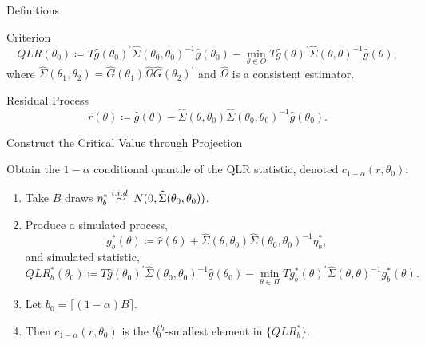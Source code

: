 \documentclass[smaller, aspectratio=169]{beamer}
\begin{document}
\begin{frame}[c]{Definitions}

    \begin{block}{Criterion}
        \begin{equation*}
          QLR(\theta_{0}) \coloneqq T \widehat{g} (\theta_{0})^{\prime}\widehat{\Sigma} (\theta_{0}, \theta_{0})^{-1}\widehat{g}(\theta_{0})-\underset{\theta \in \Theta}{\min}T\widehat{g}(\theta)^{\prime}\widehat{\Sigma} (\theta, \theta)^{-1}\widehat{g}(\theta),  
        \end{equation*}
        \quad where $\widehat{\Sigma}\left(\theta_{1}, \theta_{2}\right) = \widehat{G}(\theta_{1})\widehat{\Omega}\widehat{G}(\theta_{2})^{\prime}$ and $\widehat{\Omega}$ is a consistent estimator.
    \end{block}
 
    \vfill
%    
    \begin{block}{Residual Process}
        \begin{equation*}
          \widehat{r}(\theta) \coloneqq \widehat{g}(\theta)-\widehat{\Sigma}(\theta, \theta_{0})\widehat{\Sigma}(\theta_{0}, \theta_{0})^{-1}\widehat{g} (\theta_{0}). 
        \end{equation*}
    \end{block}

\end{frame}

\begin{frame}[c]{Construct the Critical Value through Projection}

Obtain the $1-\alpha $ conditional quantile of the QLR statistic, denoted $c_{1-\alpha }(r,\theta_{0})$: 
\bigskip

\begin{enumerate}
    \item Take $B$ draws $\eta_{b}^{\ast} \overset{i.i.d.}{\sim} N(0,\widehat{\Sigma}(\theta_{0},\theta_{0}))$. 
%
        \medskip
%
    \item Produce a simulated process, 
%
        \begin{equation*}
            g_{b}^{\ast}(\theta) \coloneqq \widehat{r}(\theta) + \widehat{\Sigma}(\theta, \theta_{0}) \widehat{\Sigma}(\theta_{0},\theta_{0})^{-1}\eta_{b}^{\ast},
        \end{equation*}
%
        and simulated statistic,
%
        \begin{equation*}
            QLR_{b}^{\ast}(\theta_{0}) \coloneqq T\widehat{g}(\theta_{0})^{\prime}\widehat{\Sigma}(\theta_{0},\theta_{0})^{-1}\widehat{g}(\theta_{0})-\underset{\theta \in \Pi}{\min}Tg_{b}^{\ast}(\theta)^{\prime}\widehat{\Sigma} (\theta ,\theta)^{-1}g_{b}^{\ast}(\theta).
        \end{equation*}
%
        \item  Let $b_{0}=\lceil (1-\alpha) B \rceil$. 
        \medskip
%
        \item Then $c_{1 - \alpha}(r, \theta_{0})$ is the $b_{0}^{th}$-smallest element in $\lbrace QLR_{b}^{\ast} \rbrace$.
    \end{enumerate}

\end{frame}
\end{document}
